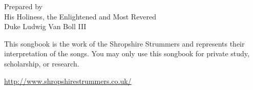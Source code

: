 \documentclass[11pt, a4paper, chordbk]{../SSSongbook}
\begin{document}
  {Prepared by\\
    His Holiness, the Enlightened and Most Revered\\
    Duke Ludwig Van Boll III}

\ifChordBk
  \fancyhead[R,L]{}
  \tableofcontents %
  \vfil
  This songbook is the work of the Shropshire Strummers
  and represents their interpretation of the songs. 
  You may only use this songbook for private study, 
  scholarship, or research.\par
  \begin{center}
    \url{http://www.shropshirestrummers.co.uk/}
  \end{center}
  \pagebreak 
\fi













\end{document}
